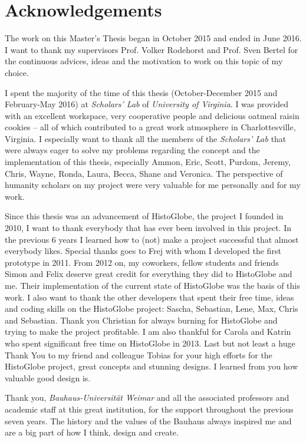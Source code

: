 
\section*{Acknowledgements} %
\label{cha:acknowledgements}

The work on this Master's Thesis began in October 2015 and ended in June 2016. I want to thank my supervisors Prof. Volker Rodehorst and Prof. Sven Bertel for the continuous advices, ideas and the motivation to work on this topic of my choice.

I spent the majority of the time of this thesis (October-December 2015 and February-May 2016) at \emph{Scholars' Lab} of \emph{University of Virginia}. I was provided with an excellent workspace, very cooperative people and delicious oatmeal raisin cookies -- all of which contributed to a great work atmosphere in Charlottesville, Virginia. I especially want to thank all the members of the \emph{Scholars' Lab} that were always eager to solve my problems regarding the concept and the implementation of this thesis, especially Ammon, Eric, Scott, Purdom, Jeremy, Chris, Wayne, Ronda, Laura, Becca, Shane and Veronica. The perspective of humanity scholars on my project were very valuable for me personally and for my work.

Since this thesis was an advancement of HistoGlobe, the project I founded in 2010, I want to thank everybody that has ever been involved in this project. In the previous 6 years I learned how to (not) make a project successful that almost everybody likes. Special thanks goes to Frej with whom I developed the first prototype in 2011. From 2012 on, my coworkers, fellow students and friends Simon and Felix deserve great credit for everything they did to HistoGlobe and me. Their implementation of the current state of HistoGlobe was the basis of this work. I also want to thank the other developers that spent their free time, ideas and coding skills on the HistoGlobe project: Sascha, Sebastian, Lene, Max, Chris and Sebastian. Thank you Christian for always burning for HistoGlobe and trying to make the project profitable. I am also thankful for Carola and Katrin who spent significant free time on HistoGlobe in 2013. Last but not least a huge Thank You to my friend and colleague Tobias for your high efforts for the HistoGlobe project, great concepts and stunning designs. I learned from you how valuable good design is.

Thank you, \emph{Bauhaus-Universität Weimar} and all the associated professors and academic staff at this great institution, for the support throughout the previous seven years. The history and the values of the Bauhaus always inspired me and are a big part of how I think, design and create.

